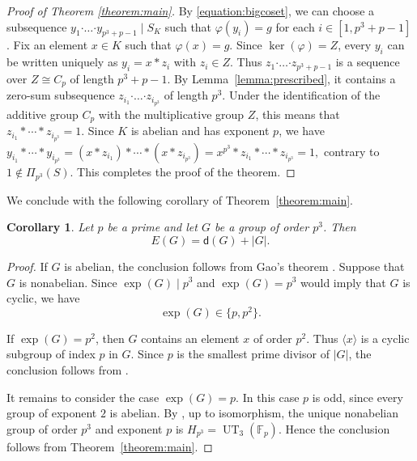\documentclass[a4paper, 12pt]{article}
\newtheorem{corollary}[theorem]{Corollary}
\theoremstyle{definition}
\begin{document}
\begin{proof}[Proof of Theorem \ref{theorem:main}]
By \eqref{equation:bigcoset}, we can choose a subsequence
$y_1\boldsymbol{\cdot}\ldots
\boldsymbol{\cdot}y_{p^3+p-1}
\mid S_K$
such that $\varphi(y_i)=g$ for each
$i\in[1,p^3+p-1]$. Fix an element $x\in K$ such that
$\varphi(x)=g$. Since
$\ker(\varphi)=Z$, every $y_i$ can be written uniquely as
$y_i=x\ast z_i$ with $z_i\in Z.$
Thus
$z_1\boldsymbol{\cdot}\ldots
\boldsymbol{\cdot}z_{p^3+p-1}$
is a sequence over $Z\cong C_p$ of length $p^3+p-1$.
By Lemma~\ref{lemma:prescribed}, it contains a zero-sum subsequence
$z_{i_1}\boldsymbol{\cdot}\ldots
\boldsymbol{\cdot}z_{i_{p^3}}$
of length $p^3$. Under the identification of the additive group
$C_p$ with the multiplicative group $Z$, this means that
$z_{i_1}\ast\cdots \ast z_{i_{p^3}}=1.$
Since $K$ is abelian and has exponent $p$, we have
$y_{i_1}\ast \cdots \ast y_{i_{p^3}}
=(x\ast z_{i_1})\ast \cdots\ast (x\ast z_{i_{p^3}})
=x^{p^3}\ast z_{i_1}\ast \cdots \ast z_{i_{p^3}}
=1,$
contrary to $1\notin\Pi_{p^3}(S)$. This completes the proof of the theorem.
\end{proof}

We conclude with the following corollary of Theorem~\ref{theorem:main}.

\begin{corollary}\label{corollary:orderp3}
Let $p$ be a prime and let $G$ be a group of order $p^3$. Then
$$
E(G)=\mathsf d(G)+|G|.
$$
\end{corollary}

\begin{proof}
If $G$ is abelian, the conclusion follows from Gao's theorem
\cite{Gao1996}. Suppose that $G$ is nonabelian. Since
$\exp(G)\mid p^3$ and $\exp(G)=p^3$ would imply that $G$ is cyclic,
we have
$$
\exp(G)\in\{p,p^2\}.
$$

If $\exp(G)=p^2$, then $G$ contains an element $x$ of order $p^2$.
Thus $\langle x\rangle$ is a cyclic subgroup of index $p$ in $G$.
Since $p$ is the smallest prime divisor of $|G|$, the conclusion
follows from \cite[Corollary~4.5]{QuWangLi}.

It remains to consider the case $\exp(G)=p$. In this case $p$ is
odd, since every group of exponent $2$ is abelian. By
\cite[Chapter~5, Theorem~5.1]{Gorenstein}, up to isomorphism, the
unique nonabelian group of order $p^3$ and exponent $p$ is
$H_{p^3}=\operatorname{UT}_3(\mathbb F_p)$. Hence the conclusion follows from
Theorem~\ref{theorem:main}.
\end{proof}




\bigskip
\end{document}
